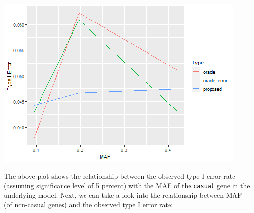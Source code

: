 \documentclass[
]{article}
\begin{document}
\includegraphics{stats-gene-research-progress-v8_files/figure-latex/errorcompare-1.png}

The above plot shows the relationship between the observed type I error
rate (assuming significance level of 5 percent) with the MAF of the
\texttt{casual} gene in the underlying model. Next, we can take a look
into the relationship between MAF (of non-casual genes) and the observed
type I error rate:
\end{document}
